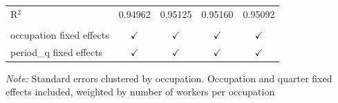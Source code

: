 \begin{longtable}{lcccc}
  R$^2$                           & 0.94962                              & 0.95125         & 0.95160         & 0.95092         \\
  \\
  occupation fixed effects        & $\checkmark$                         & $\checkmark$    & $\checkmark$    & $\checkmark$    \\
  period\_q fixed effects         & $\checkmark$                         & $\checkmark$    & $\checkmark$    & $\checkmark$    \\
\end{longtable}
\vspace{-1.5em}
\textit{Note: } Standard errors clustered by occupation. Occupation and quarter fixed effects included, weighted by number of workers per occupation
\endgroup

\newpage


